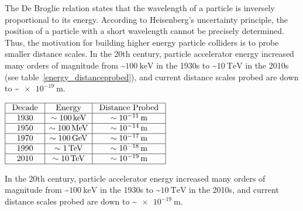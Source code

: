 The De Broglie relation states that the wavelength of a particle is inversely proportional to its energy.
According to Heisenberg's uncertainty principle, the position of a particle with a short wavelength cannot be precisely determined.
Thus, the motivation for building higher energy particle colliders is to probe smaller distance scales.
In the 20th century, particle accelerator energy increased many orders of magnitude from \sim$\SI{100}{\keV}$ in the 1930s to \sim$\SI{10}{\TeV}$ in the 2010s (see table~\ref{energy_distanceprobed}), and current distance scales probed are down to \sim$\SI{e-19}{\m}$.
\begin{table}[!htb]
\begin{center}
\begin{math}
\begin{array}{|c|c|c|}
\hline \text { Decade } & \text { Energy } & \text { Distance Probed } \\
\hline 1930 & \sim \SI{100}{\keV} & \sim \SI{e-11}{\m} \\
\hline 1950 & \sim \SI{100}{\MeV} & \sim \SI{e-14}{\m} \\
\hline 1970 & \sim \SI{100}{\GeV} & \sim \SI{e-17}{\m} \\
\hline 1990 & \sim \SI{1}{\TeV} & \sim \SI{e-18}{\m} \\
\hline 2010 & \sim \SI{10}{\TeV} & \sim \SI{e-19}{\m} \\
\hline
\end{array}
\end{math}
\caption{In the 20th century, particle accelerator energy increased many orders of magnitude from \sim$\SI{100}{\keV}$ in the 1930s to \sim$\SI{10}{\TeV}$ in the 2010s, and current distance scales probed are down to \sim$\SI{e-19}{\m}$.
        }
\label{energy_distanceprobed}
\end{center}
\end{table}

